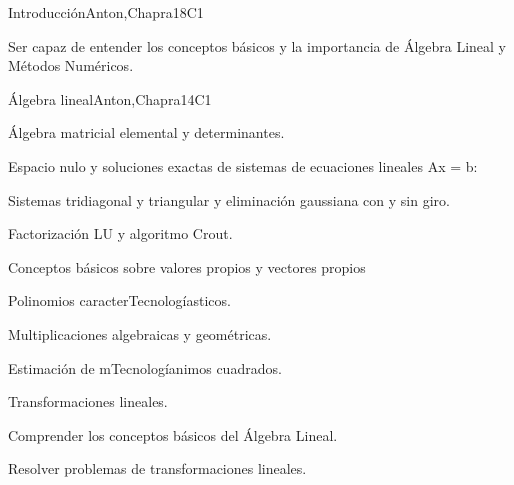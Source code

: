 \begin{syllabus}
\begin{unit}{Introducción}{}{Anton,Chapra}{18}{C1}
   \begin{learningoutcomes}
      \item Ser capaz de entender los conceptos básicos y la importancia de Álgebra Lineal y Métodos Numéricos.
   \end{learningoutcomes}
\end{unit}

\begin{unit}{Álgebra lineal}{}{Anton,Chapra}{14}{C1}
   \begin{topics}
    \item Álgebra matricial elemental y determinantes.
    \item Espacio nulo y soluciones exactas de sistemas de ecuaciones lineales Ax = b:
	  \begin{subtopics}
	    \item Sistemas tridiagonal y triangular y eliminación gaussiana con y sin giro.
	    \item Factorización LU y algoritmo Crout.
	  \end{subtopics}
    \item Conceptos básicos sobre valores propios y vectores propios
	  \begin{subtopics}
	    \item Polinomios caracterTecnologíasticos.
	    \item Multiplicaciones algebraicas y geométricas.
	  \end{subtopics}
    \item Estimación de mTecnologíanimos cuadrados.
    \item Transformaciones lineales.
    \end{topics}

   \begin{learningoutcomes}
      \item Comprender los conceptos básicos del Álgebra Lineal.
      \item Resolver problemas de transformaciones lineales.
   \end{learningoutcomes}
\end{unit}


\end{syllabus}
